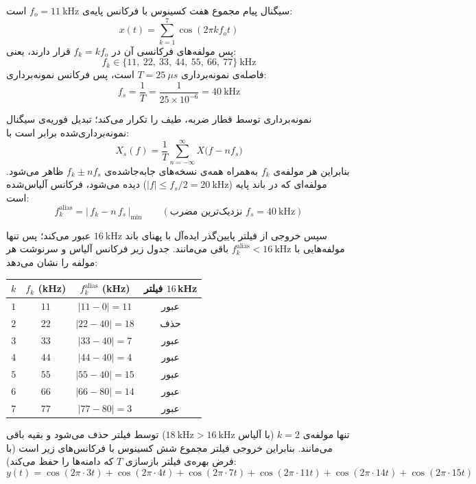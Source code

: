 سیگنال پیام مجموع هفت کسینوس با فرکانس پایه‌ی $f_o = 11\ \text{kHz}$ است:
\[
x(t) = \sum_{k=1}^{7} \cos(2\pi k f_o t)
\]
پس مولفه‌های فرکانسی آن در $f_k = k f_o$ قرار دارند، یعنی:
\[
f_k \in \{11,\ 22,\ 33,\ 44,\ 55,\ 66,\ 77\}\ \text{kHz}
\]
فاصله‌ی نمونه‌برداری $T = 25\ \mu s$ است، پس فرکانس نمونه‌برداری:
\[
f_s = \frac{1}{T} = \frac{1}{25\times 10^{-6}} = 40\ \text{kHz}
\]

نمونه‌برداری توسط قطار ضربه، طیف را تکرار می‌کند؛ تبدیل فوریه‌ی سیگنال نمونه‌برداری‌شده برابر است با:
\[
X_s(f) = \frac{1}{T}\sum_{n=-\infty}^{\infty} X\big(f - n f_s\big)
\]
بنابراین هر مولفه‌ی $f_k$ به‌همراه همه‌ی نسخه‌های جابه‌جاشده‌ی $f_k \pm n f_s$ ظاهر می‌شود. مولفه‌ای که در باند پایه ($|f| \leq f_s/2 = 20\ \text{kHz}$) دیده می‌شود، فرکانس آلیاس‌شده است:
\[
f_k^{\text{alias}} = \big|\,f_k - n\,f_s\,\big|_{\min}
\qquad (\text{نزدیک‌ترین مضرب } f_s = 40\ \text{kHz})
\]

سپس خروجی از فیلتر پایین‌گذر ایده‌آل با پهنای باند $16\ \text{kHz}$ عبور می‌کند؛ پس تنها مولفه‌هایی با $f_k^{\text{alias}} < 16\ \text{kHz}$ باقی می‌مانند. جدول زیر فرکانس آلیاس و سرنوشت هر مولفه را نشان می‌دهد:
\begin{center}
\begin{LTR}
\begin{tabular}{|c|c|c|c|}
\hline
$k$ & $f_k$ (kHz) & $f_k^{\text{alias}}$ (kHz) & فیلتر $16\,$kHz \\
\hline
$1$ & $11$ & $|11-0|=11$  & عبور \\
$2$ & $22$ & $|22-40|=18$ & حذف \\
$3$ & $33$ & $|33-40|=7$  & عبور \\
$4$ & $44$ & $|44-40|=4$  & عبور \\
$5$ & $55$ & $|55-40|=15$ & عبور \\
$6$ & $66$ & $|66-80|=14$ & عبور \\
$7$ & $77$ & $|77-80|=3$  & عبور \\
\hline
\end{tabular}
\end{LTR}
\end{center}

تنها مولفه‌ی $k=2$ (با آلیاس $18\ \text{kHz} > 16\ \text{kHz}$) توسط فیلتر حذف می‌شود و بقیه باقی می‌مانند. بنابراین خروجی فیلتر مجموع شش کسینوس با فرکانس‌های زیر است (با فرض بهره‌ی فیلتر بازسازی $T$ که دامنه‌ها را حفظ می‌کند):
\[
y(t) = \cos(2\pi\!\cdot\!3t) + \cos(2\pi\!\cdot\!4t) + \cos(2\pi\!\cdot\!7t)
     + \cos(2\pi\!\cdot\!11t) + \cos(2\pi\!\cdot\!14t) + \cos(2\pi\!\cdot\!15t)
\]

